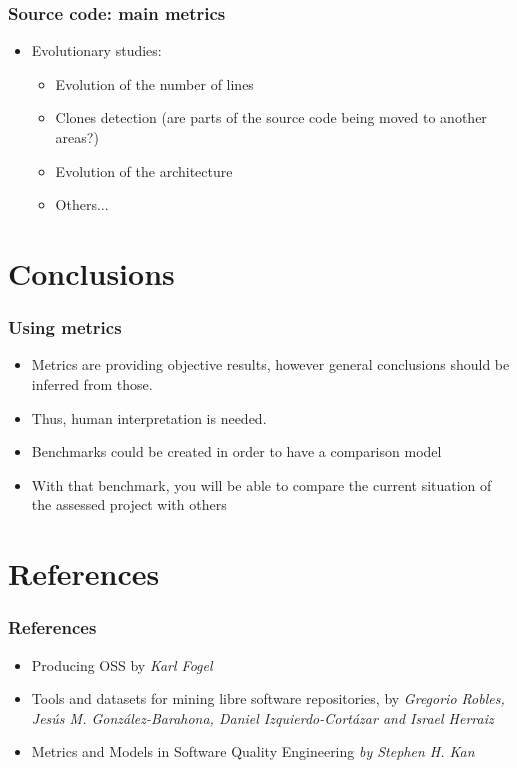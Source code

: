 \documentclass{beamer}
\begin{document}
\begin{frame}
 \frametitle{Source code: main metrics}
 \begin{itemize}
 \item Evolutionary studies:
  \begin{itemize}
   \item Evolution of the number of lines
   \item Clones detection (are parts of the source code being moved to another areas?)
   \item Evolution of the architecture
   \item Others...
  \end{itemize}
 \end{itemize}
\end{frame}


\section{Conclusions}

\begin{frame}
 \frametitle{Using metrics}
 \begin{itemize}
 \item Metrics are providing objective results, however general conclusions
 should be inferred from those.

 \item Thus, human interpretation is needed.

 \item Benchmarks could be created in order to have a comparison model

 \item With that benchmark, you will be able to compare the current situation of the 
 assessed project with others 

 

 \end{itemize}

\end{frame}


\section{References}

\begin{frame}
 \frametitle{References}
 \begin{itemize}
 \item Producing OSS by \textit{Karl Fogel}
 \item Tools and datasets for mining libre software repositories, by
 \textit{Gregorio Robles, Jes\'us M. Gonz\'alez-Barahona, Daniel Izquierdo-Cort\'azar and Israel Herraiz}
 \item Metrics and Models in Software Quality Engineering
 \textit{by Stephen H. Kan}
 \end{itemize}

\end{frame}
\end{document}
